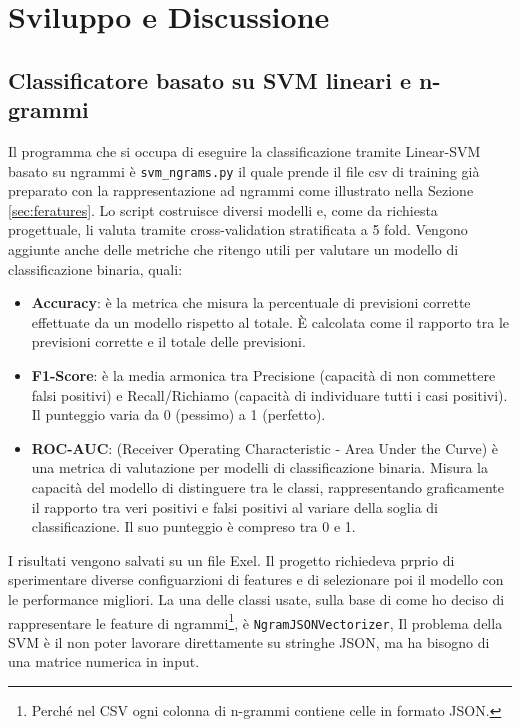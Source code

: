 \documentclass[a4paper,12pt]{report}
\begin{document}
    \chapter{Sviluppo e Discussione}
    \section{Classificatore basato su SVM lineari e n-grammi}
    Il programma che si occupa di eseguire la classificazione tramite Linear-SVM basato su ngrammi è \texttt{svm\_ngrams.py} il quale prende il file csv di training già preparato con la rappresentazione ad ngrammi come illustrato nella Sezione \ref{sec:feratures}. Lo script costruisce diversi modelli e, come da richiesta progettuale, li valuta tramite cross-validation stratificata a 5 fold. Vengono aggiunte anche delle metriche che ritengo utili per valutare un modello di classificazione binaria, quali:
    \begin{itemize}
        \item \textbf{Accuracy}: è la metrica che misura la percentuale di previsioni corrette effettuate da un modello rispetto al totale. È calcolata come il rapporto tra le previsioni corrette e il totale delle previsioni.
        \item \textbf{F1-Score}: è la media armonica tra Precisione (capacità di non commettere falsi positivi) e Recall/Richiamo (capacità di individuare tutti i casi positivi). Il punteggio varia da 0 (pessimo) a 1 (perfetto). 
        \item \textbf{ROC-AUC}: (Receiver Operating Characteristic - Area Under the Curve) è una metrica di valutazione per modelli di classificazione binaria. Misura la capacità del modello di distinguere tra le classi, rappresentando graficamente il rapporto tra veri positivi e falsi positivi al variare della soglia di classificazione. Il suo punteggio è compreso tra 0 e 1.
    \end{itemize}
    I risultati vengono salvati su un file Exel. Il progetto richiedeva prprio di sperimentare diverse configuarzioni di features e di selezionare poi il modello con le performance migliori. La una delle classi usate, sulla base di come ho deciso di rappresentare le feature di ngrammi\footnote{Perché nel CSV ogni colonna di n-grammi contiene celle in formato JSON.}, è \texttt{NgramJSONVectorizer}, Il problema della SVM è il non poter lavorare direttamente su stringhe JSON, ma ha bisogno di una matrice numerica in input.
\end{document}
